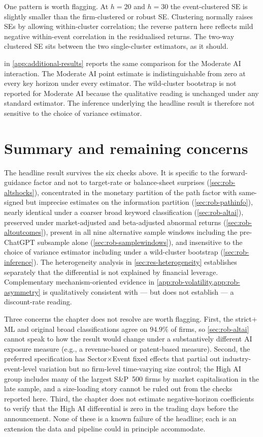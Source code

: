 One pattern is worth flagging. At $h = 20$ and $h = 30$ the
event-clustered SE is slightly smaller than the firm-clustered or
robust SE. Clustering normally raises SEs by allowing within-cluster
correlation; the reverse pattern here reflects mild negative
within-event correlation in the residualised returns. The two-way
clustered SE sits between the two single-cluster estimators, as it
should.

 in \cref{app:additional-results}
reports the same comparison for the Moderate AI interaction. The
Moderate AI point estimate is indistinguishable from zero at every
key horizon under every estimator. The wild-cluster bootstrap is not
reported for Moderate AI because the qualitative reading is unchanged
under any standard estimator. The inference underlying the headline
result is therefore not sensitive to the choice of variance
estimator.

\section{Summary and remaining concerns}
\label{sec:rob-summary}

The headline result survives the six checks above. It is specific to
the forward-guidance factor and not to target-rate or balance-sheet
surprises (\cref{sec:rob-altshocks}), concentrated in the monetary
partition of the path factor with same-signed but imprecise estimates
on the information partition (\cref{sec:rob-pathinfo}), nearly
identical under a coarser broad keyword classification
(\cref{sec:rob-altai}), preserved under market-adjusted and
beta-adjusted abnormal returns (\cref{sec:rob-altoutcomes}), present
in all nine alternative sample windows including the pre-ChatGPT
subsample alone (\cref{sec:rob-samplewindows}), and insensitive to
the choice of variance estimator including under a wild-cluster
bootstrap (\cref{sec:rob-inference}). The heterogeneity analysis in
\cref{sec:res-heterogeneity} establishes separately that the
differential is not explained by financial leverage. Complementary
mechanism-oriented evidence in
\cref{app:rob-volatility,app:rob-asymmetry} is qualitatively
consistent with --- but does not establish --- a discount-rate
reading.

Three concerns the chapter does not resolve are worth flagging.
First, the strict$+$ML and original broad classifications agree on
$94.9\%$ of firms, so \cref{sec:rob-altai} cannot speak to how the
result would change under a substantively different AI exposure
measure (e.g., a revenue-based or patent-based measure). Second, the
preferred specification has Sector$\times$Event fixed effects that
partial out industry-event-level variation but no firm-level
time-varying size control; the High AI group includes many of the
largest S\&P~500 firms by market capitalisation in the late sample,
and a size-loading story cannot be ruled out from the checks reported
here. Third, the chapter does not estimate negative-horizon
coefficients to verify that the High AI differential is zero in the
trading days before the announcement. None of these is a known
failure of the headline; each is an extension the data and pipeline
could in principle accommodate.